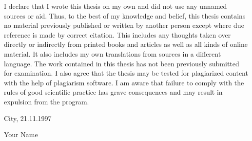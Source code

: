 
I declare that I wrote this thesis on my own and did not use any unnamed sources or aid. Thus, to the best of my knowledge and belief, this thesis contains no material previously published or written by another person except where due reference is made by correct citation. This includes any thoughts taken over directly or indirectly from printed books and articles as well as all kinds of online material. It also includes my own translations from sources in a different language. The work contained in this thesis has not been previously submitted for examination. I also agree that the thesis may be tested for plagiarized content with the help of plagiarism software. I am aware that failure to comply with the rules of good scientific practice has grave consequences and may result in expulsion from the program.


{\parindent0pt

    \vskip 1cm

    City, 21.11.1997

    \vskip 0.3cm
    

    Your Name
}
